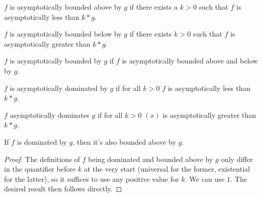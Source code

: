 \begin{definition}
    \label{def:asymp_bounded_above}
    \leanok
    $f$ is asymptotically bounded above by $g$ if there exists a $k > 0$ 
    such that $f$ is asymptotically less than $k*g$.
\end{definition}

\begin{definition}
    \label{def:asymp_bounded_below}
    \leanok
    $f$ is asymptotically bounded below by $g$ if there exists $k > 0$ 
    such that $f$ is asymptotically greater than $k*g$.
\end{definition}

\begin{definition}
    \label{def:asymp_bounded}
    \leanok
    $f$ is asymptotically bounded by $g$ if $f$ is asymptotically bounded
    above and below by $g$.
\end{definition}

\begin{definition}
    \label{def:asymp_right_dom}
    \leanok
    $f$ is asymptotically dominated by $g$ if for all $k > 0$ $f$ is asymptotically 
    less than $k*g$.

\end{definition}

\begin{definition}
    \label{def:asymp_left_dom}
    \leanok
    $f$ asymptotically dominates $g$ if for all $k > 0$ $(x)$ is asymptotically
    greater than $k*g$.

\end{definition}

\begin{lemma}
    \label{lemma:asymp_right_dom_imp_bounded_above}
    \leanok
    If $f$ is dominated by $g$, then it's also bounded above by $g$.
\end{lemma}

\begin{proof}
    \leanok 
    The definitions of $f$ being dominated and bounded above by $g$ only differ
    in the quantifier before $k$ at the very start (universal for the former, existential
    for the latter), so it suffices to use any positive value for $k$. We can use $1$. 
    The desired result then follows directly.
\end{proof}

